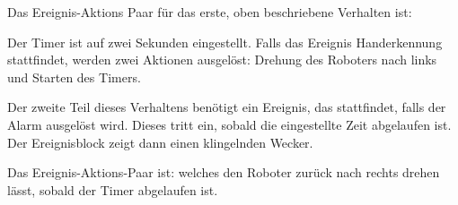 Das Ereignis-Aktions Paar für das erste, oben beschriebene Verhalten ist: 

Der Timer ist auf zwei Sekunden eingestellt. Falls das Ereignis Handerkennung stattfindet, werden zwei Aktionen ausgelöst: Drehung des Roboters nach links und Starten des Timers.

Der zweite Teil dieses Verhaltens benötigt ein Ereignis, das stattfindet, falls der Alarm ausgelöst wird. Dieses tritt ein, sobald die eingestellte Zeit abgelaufen ist. Der Ereignisblock  zeigt dann einen klingelnden Wecker.


Das Ereignis-Aktions-Paar ist:  welches den Roboter zurück nach rechts drehen lässt, sobald der Timer abgelaufen ist.

